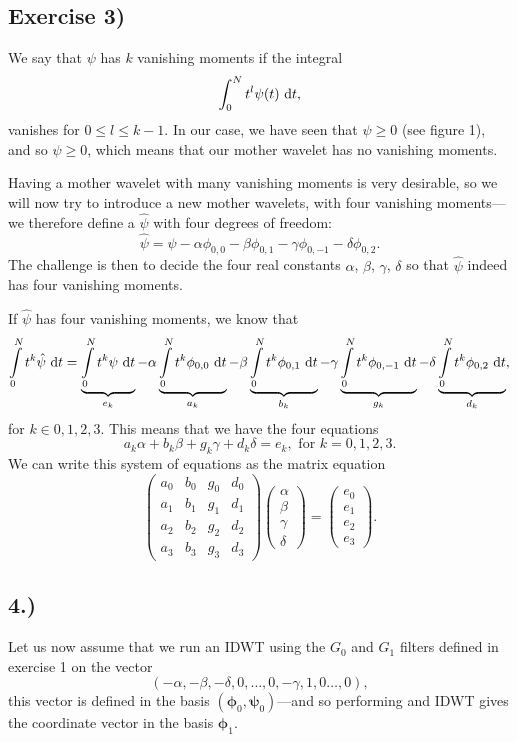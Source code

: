 \documentclass[a4paper, 11pt, notitlepage, english]{article}
\renewcommand{\d}{{\rm d}}
\newcommand{\bt}[1]{\boldsymbol{#1}}
\begin{document}
\clearpage

\subsection*{Exercise 3)}
We say that $\psi$ has $k$ vanishing moments if the integral 
        $$\int_0^N t^l \psi(t) \ \d t,$$
vanishes for $0\leq l \leq k-1$. In our case, we have seen that $\psi \geq 0$ (see figure 1), and so $\psi\geq 0$, which means that our mother wavelet has no vanishing moments.

Having a mother wavelet with many vanishing moments is very desirable, so we will now try to introduce a new mother wavelets, with four vanishing moments---we therefore define a $\hat{\psi}$ with four degrees of freedom:
$$\hat{\psi} = \psi - \alpha\phi_{0,0} - \beta\phi_{0,1}-\gamma\phi_{0,-1} - \delta\phi_{0,2}.$$
The challenge is then to decide the four real constants $\alpha$, $\beta$, $\gamma$, $\delta$ so that $\hat{\psi}$ indeed has four vanishing moments.

If $\hat{\psi}$ has four vanishing moments, we know that
$$\int\limits_0^N t^k \hat{\psi} \ \d t = \underbrace{\int\limits_0^N t^k\psi\ \d t}_{e_k} - \alpha \underbrace{\int\limits_0^N t^k\phi_{0,0}\ \d t}_{a_k} - \beta\underbrace{\int\limits_0^N t^k\phi_{0,1}\ \d t}_{b_k}-\gamma\underbrace{\int\limits_0^N t^k\phi_{0,-1}\ \d t}_{g_k} - \delta\underbrace{\int\limits_0^N t^k \phi_{0,2}\ \d t}_{d_k},$$
for $k\in{0,1,2,3}$.
This means that we have the four equations
$$a_k\alpha + b_k\beta + g_k \gamma + d_k\delta = e_k, \mbox{ for } k=0,1,2,3.$$
We can write this system of equations as the matrix equation
$$\begin{pmatrix}
a_0 & b_0 & g_0 & d_0 \\
a_1 & b_1 & g_1 & d_1 \\
a_2 & b_2 & g_2 & d_2 \\
a_3 & b_3 & g_3 & d_3 
\end{pmatrix}
\begin{pmatrix}
    \alpha \\ \beta \\ \gamma \\ \delta
\end{pmatrix} = 
\begin{pmatrix}
    e_0 \\ e_1 \\ e_2 \\ e_3
\end{pmatrix}
.
$$

\subsection*{4.)}
Let us now assume that we run an IDWT using the $G_0$ and $G_1$ filters defined in exercise 1 on the vector
$$(-\alpha,-\beta,-\delta,0,\ldots,0,-\gamma,1,0\ldots,0),$$
this vector is defined in the basis $(\bt{\phi}_0,\bt{\psi}_0)$---and so performing and IDWT gives the coordinate vector in the basis $\bt{\phi}_1$.
\end{document}

